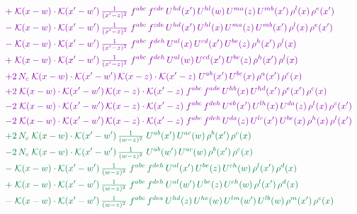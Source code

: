 \documentclass[10pt]{article}
\numberwithin{equation}{section}
\begin{document}
\begin{align}
&\quad{\color{CC}+\;\mathcal{K}(x-w)\cdot\mathcal{K}(x'-w')\,\tfrac{1}{(x'-z)^{2}}\;f^{abc}\,f^{cde}\,U^{hd}(x')\,U^{hl}(w)\,U^{ma}(z)\,U^{mb}(x')\,\rho^{l}(x)\,\rho^{e}(x')}\notag\\
&\quad{\color{CC}-\;\mathcal{K}(x-w)\cdot\mathcal{K}(x'-w')\,\tfrac{1}{(x'-z)^{2}}\;f^{abc}\,f^{cde}\,U^{hd}(x')\,U^{hl}(x)\,U^{ma}(z)\,U^{mb}(x')\,\rho^{l}(x)\,\rho^{e}(x')}\notag\\
&\quad{\color{CC}-\;\mathcal{K}(x-w)\cdot\mathcal{K}(x'-w')\,\tfrac{1}{(x'-z)^{2}}\;f^{abc}\,f^{deh}\,U^{al}(x)\,U^{cd}(x')\,U^{be}(z)\,\rho^{h}(x')\,\rho^{l}(x)}\notag\\
&\quad{\color{CC}+\;\mathcal{K}(x-w)\cdot\mathcal{K}(x'-w')\,\tfrac{1}{(x'-z)^{2}}\;f^{abc}\,f^{deh}\,U^{al}(w)\,U^{cd}(x')\,U^{be}(z)\,\rho^{h}(x')\,\rho^{l}(x)}\notag\\
&\quad{\color{CC}+2\,N_c\;\mathcal{K}(x-w)\cdot\mathcal{K}(x'-w')\,\mathcal{K}(x-z)\cdot\mathcal{K}(x'-z)\;U^{ab}(x')\,U^{bc}(x)\,\rho^{a}(x')\,\rho^{c}(x)}\notag\\
&\quad{\color{CC}+2\;\mathcal{K}(x-w)\cdot\mathcal{K}(x'-w')\,\mathcal{K}(x-z)\cdot\mathcal{K}(x'-z)\;f^{abc}\,f^{ade}\,U^{hb}(x)\,U^{hd}(x')\,\rho^{e}(x')\,\rho^{c}(x)}\notag\\
&\quad{\color{CC}-2\;\mathcal{K}(x-w)\cdot\mathcal{K}(x'-w')\,\mathcal{K}(x-z)\cdot\mathcal{K}(x'-z)\;f^{abc}\,f^{deh}\,U^{eb}(x')\,U^{lh}(x)\,U^{da}(z)\,\rho^{l}(x)\,\rho^{c}(x')}\notag\\
&\quad{\color{CC}-2\;\mathcal{K}(x-w)\cdot\mathcal{K}(x'-w')\,\mathcal{K}(x-z)\cdot\mathcal{K}(x'-z)\;f^{abc}\,f^{deh}\,U^{da}(z)\,U^{lc}(x')\,U^{be}(x)\,\rho^{h}(x)\,\rho^{l}(x')}\notag\\
&\quad{\color{JIM}+2\,N_c\;\mathcal{K}(x-w)\cdot\mathcal{K}(x'-w')\,\tfrac{1}{(w-z)^{2}}\;U^{ab}(x')\,U^{ac}(w)\,\rho^{b}(x')\,\rho^{c}(x)}\notag\\
&\quad{\color{JIM}-2\,N_c\;\mathcal{K}(x-w)\cdot\mathcal{K}(x'-w')\,\tfrac{1}{(w-z)^{2}}\;U^{ab}(w')\,U^{ac}(w)\,\rho^{b}(x')\,\rho^{c}(x)}\notag\\
&\quad{\color{JIM}-\;\mathcal{K}(x-w)\cdot\mathcal{K}(x'-w')\,\tfrac{1}{(w-z)^{2}}\;f^{abc}\,f^{deh}\,U^{al}(x')\,U^{be}(z)\,U^{ch}(w)\,\rho^{l}(x')\,\rho^{d}(x)}\notag\\
&\quad{\color{JIM}+\;\mathcal{K}(x-w)\cdot\mathcal{K}(x'-w')\,\tfrac{1}{(w-z)^{2}}\;f^{abc}\,f^{deh}\,U^{al}(w')\,U^{be}(z)\,U^{ch}(w)\,\rho^{l}(x')\,\rho^{d}(x)}\notag\\
&\quad{\color{JIM}-\;\mathcal{K}(x-w)\cdot\mathcal{K}(x'-w')\,\tfrac{1}{(w-z)^{2}}\;f^{abc}\,f^{dea}\,U^{hd}(z)\,U^{he}(w)\,U^{lm}(w')\,U^{lb}(w)\,\rho^{m}(x')\,\rho^{c}(x)}\notag\\

\end{align}
\end{document}
